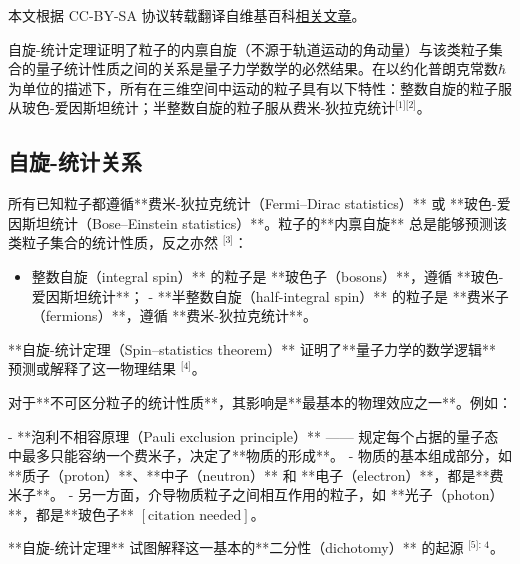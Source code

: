 
本文根据 CC-BY-SA 协议转载翻译自维基百科\href{https://en.wikipedia.org/wiki/Spin\%E2\%80\%93statistics_theorem}{相关文章}。

自旋-统计定理证明了粒子的内禀自旋（不源于轨道运动的角动量）与该类粒子集合的量子统计性质之间的关系是量子力学数学的必然结果。在以约化普朗克常数\( \hbar \)为单位的描述下，所有在三维空间中运动的粒子具有以下特性：整数自旋的粒子服从玻色-爱因斯坦统计；半整数自旋的粒子服从费米-狄拉克统计\(^\text{[1][2]}\)。
\subsection{自旋-统计关系} 
所有已知粒子都遵循**费米-狄拉克统计（Fermi–Dirac statistics）** 或 **玻色-爱因斯坦统计（Bose–Einstein statistics）**。粒子的**内禀自旋** 总是能够预测该类粒子集合的统计性质，反之亦然 \(^\text{[3]}\)：  

\begin{itemize}
\item 整数自旋（integral spin）** 的粒子是 **玻色子（bosons）**，遵循 **玻色-爱因斯坦统计**；  
- **半整数自旋（half-integral spin）** 的粒子是 **费米子（fermions）**，遵循 **费米-狄拉克统计**。  
\end{itemize}

**自旋-统计定理（Spin–statistics theorem）** 证明了**量子力学的数学逻辑** 预测或解释了这一物理结果 \(^\text{[4]}\)。  

对于**不可区分粒子的统计性质**，其影响是**最基本的物理效应之一**。例如：  

- **泡利不相容原理（Pauli exclusion principle）** —— 规定每个占据的量子态中最多只能容纳一个费米子，决定了**物质的形成**。  
- 物质的基本组成部分，如 **质子（proton）**、**中子（neutron）** 和 **电子（electron）**，都是**费米子**。  
- 另一方面，介导物质粒子之间相互作用的粒子，如 **光子（photon）**，都是**玻色子** \([\text{citation needed}]\)。  

**自旋-统计定理** 试图解释这一基本的**二分性（dichotomy）** 的起源 \(^\text{[5]: 4}\)。